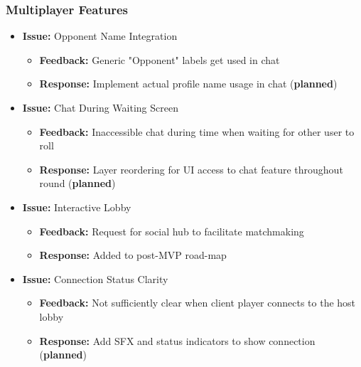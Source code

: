 \documentclass{article}
\begin{document}
\subsubsection{Multiplayer Features}
\begin{itemize}
    \item \textbf{Issue:} Opponent Name Integration
    \begin{itemize}
        \item \textbf{Feedback:} Generic "Opponent" labels get used in chat
        \item \textbf{Response:} Implement actual profile name usage in chat (\textbf{planned})
    \end{itemize}
    
    \item \textbf{Issue:} Chat During Waiting Screen
    \begin{itemize}
        \item \textbf{Feedback:} Inaccessible chat during time when waiting for other user to roll
        \item \textbf{Response:} Layer reordering for UI access to chat feature throughout round (\textbf{planned})
    \end{itemize}
    
    \item \textbf{Issue:} Interactive Lobby
    \begin{itemize}
        \item \textbf{Feedback:} Request for social hub to facilitate matchmaking
        \item \textbf{Response:} Added to post-MVP road-map
    \end{itemize}
    
    \item \textbf{Issue:} Connection Status Clarity
    \begin{itemize}
        \item \textbf{Feedback:} Not sufficiently clear when client player connects to the host lobby
        \item \textbf{Response:} Add SFX and status indicators to show connection (\textbf{planned})
    \end{itemize}
\end{itemize}
\end{document}
